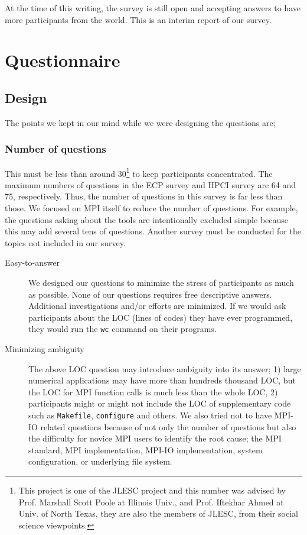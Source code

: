 \documentclass[submit,techrep,noauthor,english]{ipsj}
\begin{document}
At the time of this writing, the survey is still open and accepting
answers to have more participants from the world. This is an interim
report of our survey.

\section{Questionnaire}

\subsection{Design}

The points we kept in our mind while we were designing the
questions are; 

\subsubsection*{Number of questions}
This must be less than around 30\footnote{This project is one of the
  JLESC project\cite{JLESC} and this number was advised by
  Prof. Marshall Scott Poole at Illinois Univ., and Prof. Iftekhar
  Ahmed at Univ. of North Texas, they are also the members of
  JLESC\cite{JLESC}, from their social science viewpoints.}
to keep participants concentrated.
The maximum numbers of questions in the ECP survey and HPCI survey are
64 and 75, respectively. Thus, the number of questions in this survey
is far less than those.  We focused on MPI itself to reduce the number
of questions.  For example, the questions asking about the tools are
intentionally excluded simple because this may add several tens of
questions. Another survey must be conducted for the topics not
included in our survey.

\begin{description}
\item[Easy-to-answer]
We designed our questions to minimize the stress of participants as
much as possible. None of our questions requires free descriptive
answers. Additional investigations and/or efforts are minimized. If we
would ask participants about the LOC (lines of codes) they have ever
programmed, they would run the {\tt wc} command on their programs.  

\item[Minimizing ambiguity]
The above LOC question may introduce ambiguity into its answer; 1)
large numerical applications may have more than hundreds thousand LOC,
but the LOC for MPI function calls is much less than the whole LOC, 2)
participants might or might not include the LOC of supplementary code
such as {\tt Makefile}, {\tt configure} and others. 
We also tried not to have MPI-IO related questions because of not only
the number of questions but also the difficulty for novice MPI users
to identify the root cause; the MPI standard, MPI implementation,
MPI-IO implementation, system configuration, or underlying file
system. 
\end{description}
\end{document}
